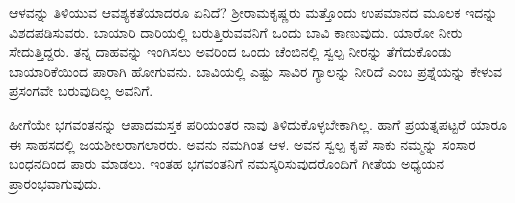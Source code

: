 ಆಳವನ್ನು ತಿಳಿಯುವ ಆವಶ್ಯಕತೆಯಾದರೂ ಏನಿದೆ? ಶ‍್ರೀರಾಮಕೃಷ್ಣರು ಮತ್ತೊಂದು ಉಪಮಾನದ ಮೂಲಕ ಇದನ್ನು ವಿಶದಪಡಿಸುವರು. ಬಾಯಾರಿ ದಾರಿಯಲ್ಲಿ ಬರುತ್ತಿರುವವನಿಗೆ ಒಂದು ಬಾವಿ ಕಾಣುವುದು. ಯಾರೋ ನೀರು ಸೇದುತ್ತಿದ್ದರು. ತನ್ನ ದಾಹವನ್ನು ಇಂಗಿಸಲು ಅವರಿಂದ ಒಂದು ಚೆಂಬಿನಲ್ಲಿ ಸ್ವಲ್ಪ ನೀರನ್ನು ತೆಗೆದುಕೊಂಡು ಬಾಯಾರಿಕೆಯಿಂದ ಪಾರಾಗಿ ಹೋಗುವನು. ಬಾವಿಯಲ್ಲಿ ಎಷ್ಟು ಸಾವಿರ ಗ್ಯಾಲನ್ನು ನೀರಿದೆ ಎಂಬ ಪ್ರಶ್ನೆಯನ್ನು ಕೇಳುವ ಪ್ರಸಂಗವೇ ಬರುವುದಿಲ್ಲ ಅವನಿಗೆ.

ಹೀಗೆಯೇ ಭಗವಂತನನ್ನು ಆಪಾದಮಸ್ತಕ ಪರಿಯಂತರ ನಾವು ತಿಳಿದುಕೊಳ್ಳಬೇಕಾಗಿಲ್ಲ. ಹಾಗೆ ಪ್ರಯತ್ನಪಟ್ಟರೆ ಯಾರೂ ಈ ಸಾಹಸದಲ್ಲಿ ಜಯಶೀಲರಾಗಲಾರರು. ಅವನು ನಮಗಿಂತ ಆಳ. ಅವನ ಸ್ವಲ್ಪ ಕೃಪೆ ಸಾಕು ನಮ್ಮನ್ನು ಸಂಸಾರ ಬಂಧನದಿಂದ ಪಾರು ಮಾಡಲು. ಇಂತಹ ಭಗವಂತನಿಗೆ ನಮಸ್ಕರಿಸುವುದರೊಂದಿಗೆ ಗೀತೆಯ ಅಧ್ಯಯನ ಪ್ರಾರಂಭವಾಗುವುದು.

